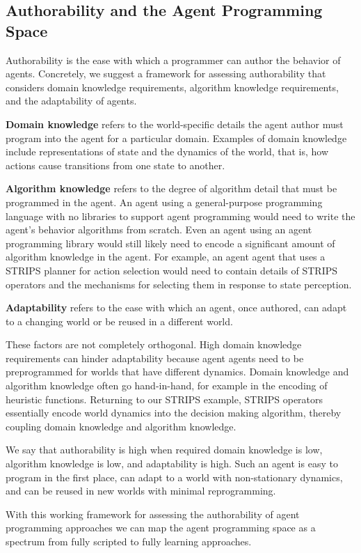 \subsection{Authorability and the Agent Programming Space}

Authorability is the ease with which a programmer can author the behavior of agents.  Concretely, we suggest a framework for assessing authorability that considers domain knowledge requirements, algorithm knowledge requirements, and the adaptability of agents.

{\bf Domain knowledge} refers to the world-specific details the agent author must program into the agent for a particular domain.  Examples of domain knowledge include representations of state and the dynamics of the world, that is, how actions cause transitions from one state to another.

{\bf Algorithm knowledge} refers to the degree of algorithm detail that must be programmed in the agent.  An agent using a general-purpose programming language with no libraries to support agent programming would need to write the agent's behavior algorithms from scratch. Even an agent using an agent programming library would still likely need to encode a significant amount of algorithm knowledge in the agent. For example, an agent agent that uses a STRIPS planner for action selection would need to contain details of STRIPS operators and the mechanisms for selecting them in response to state perception.

{\bf Adaptability} refers to the ease with which an agent, once authored, can adapt to a changing world or be reused in a different world.

These factors are not completely orthogonal.  High domain knowledge requirements can hinder adaptability because agent agents need to be preprogrammed for worlds that have different dynamics.  Domain knowledge and algorithm knowledge often go hand-in-hand, for example in the encoding of heuristic functions.  Returning to our STRIPS example, STRIPS operators essentially encode world dynamics into the decision making algorithm, thereby coupling domain knowledge and algorithm knowledge.

We say that authorability is high when required domain knowledge is low, algorithm knowledge is low, and adaptability is high.  Such an agent is easy to program in the first place, can adapt to a world with non-stationary dynamics, and can be reused in new worlds with minimal reprogramming.

With this working framework for assessing the authorability of agent programming approaches we can map the agent programming space as a spectrum from fully scripted to fully learning approaches.

